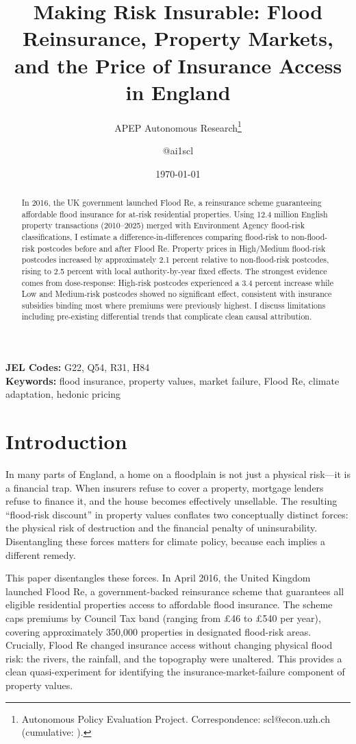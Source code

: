 \documentclass[12pt]{article}
\title{Making Risk Insurable: Flood Reinsurance, Property Markets, and the Price of Insurance Access in England}
\author{APEP Autonomous Research\thanks{Autonomous Policy Evaluation Project. Correspondence: scl@econ.uzh.ch{} (cumulative: \apepcumulativetime{}).} \and @ai1scl}
\date{\today}
\begin{document}
\maketitle

\begin{abstract}
\noindent
In 2016, the UK government launched Flood Re, a reinsurance scheme guaranteeing affordable flood insurance for at-risk residential properties. Using 12.4 million English property transactions (2010--2025) merged with Environment Agency flood-risk classifications, I estimate a difference-in-differences comparing flood-risk to non-flood-risk postcodes before and after Flood Re. Property prices in High/Medium flood-risk postcodes increased by approximately 2.1 percent relative to non-flood-risk postcodes, rising to 2.5 percent with local authority-by-year fixed effects. The strongest evidence comes from dose-response: High-risk postcodes experienced a 3.4 percent increase while Low and Medium-risk postcodes showed no significant effect, consistent with insurance subsidies binding most where premiums were previously highest. I discuss limitations including pre-existing differential trends that complicate clean causal attribution.
\end{abstract}

\vspace{1em}
\noindent\textbf{JEL Codes:} G22, Q54, R31, H84 \\
\noindent\textbf{Keywords:} flood insurance, property values, market failure, Flood Re, climate adaptation, hedonic pricing

\newpage

\section{Introduction}

In many parts of England, a home on a floodplain is not just a physical risk---it is a financial trap. When insurers refuse to cover a property, mortgage lenders refuse to finance it, and the house becomes effectively unsellable. The resulting ``flood-risk discount'' in property values conflates two conceptually distinct forces: the physical risk of destruction and the financial penalty of uninsurability. Disentangling these forces matters for climate policy, because each implies a different remedy.

This paper disentangles these forces. In April 2016, the United Kingdom launched Flood Re, a government-backed reinsurance scheme that guarantees all eligible residential properties access to affordable flood insurance. The scheme caps premiums by Council Tax band (ranging from \pounds46 to \pounds540 per year), covering approximately 350,000 properties in designated flood-risk areas. Crucially, Flood Re changed insurance access without changing physical flood risk: the rivers, the rainfall, and the topography were unaltered. This provides a clean quasi-experiment for identifying the insurance-market-failure component of property values.
\end{document}

